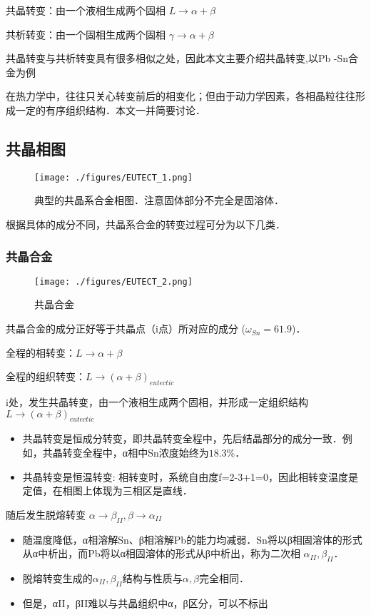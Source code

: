 共晶转变：由一个液相生成两个固相 $L \rightarrow \alpha+\beta$

共析转变：由一个固相生成两个固相 $\gamma \rightarrow \alpha+\beta$

共晶转变与共析转变具有很多相似之处，因此本文主要介绍共晶转变,以Pb
-Sn合金为例

在热力学中，往往只关心转变前后的相变化；但由于动力学因素，各相晶粒往往形成一定的有序组织结构．本文一并简要讨论．

\subsection{共晶相图}
\begin{figure}[ht]
\centering
\texttt{[image: ./figures/EUTECT\_1.png]}
\caption{典型的共晶系合金相图．注意固体部分不完全是固溶体．} \label{EUTECT_fig1}
\end{figure}
根据具体的成分不同，共晶系合金的转变过程可分为以下几类．

\subsubsection{共晶合金}
\begin{figure}[ht]
\centering
\texttt{[image: ./figures/EUTECT\_2.png]}
\caption{共晶合金} \label{EUTECT_fig2}
\end{figure}

共晶合金的成分正好等于共晶点（i点）所对应的成分 ($\omega_{Sn}=61.9$)．

全程的相转变：$L \rightarrow \alpha+\beta$

全程的组织转变：$L \rightarrow (\alpha+\beta)_{eutectic}$

i处，发生共晶转变，由一个液相生成两个固相，并形成一定组织结构 $L \rightarrow (\alpha+\beta)_{eutectic}$
\begin{itemize}
\item 共晶转变是恒成分转变，即共晶转变全程中，先后结晶部分的成分一致．例如，共晶转变全程中，α相中Sn浓度始终为$18.3\%$．
\item 共晶转变是恒温转变: 相转变时，系统自由度f=2-3+1=0，因此相转变温度是定值，在相图上体现为三相区是直线．
\end{itemize}

随后发生脱熔转变 $\alpha \rightarrow \beta_{II}, \beta \rightarrow \alpha_{II}$
\begin{itemize}
\item 随温度降低，α相溶解Sn、β相溶解Pb的能力均减弱．Sn将以β相固溶体的形式从α中析出，而Pb将以α相固溶体的形式从β中析出，称为二次相 $\alpha_{II},\beta_{II} $．
\item 脱熔转变生成的$\alpha_{II},\beta_{II} $结构与性质与$\alpha, \beta$完全相同．
\item 但是，αII，βII难以与共晶组织中α，β区分，可以不标出
\end{itemize}

